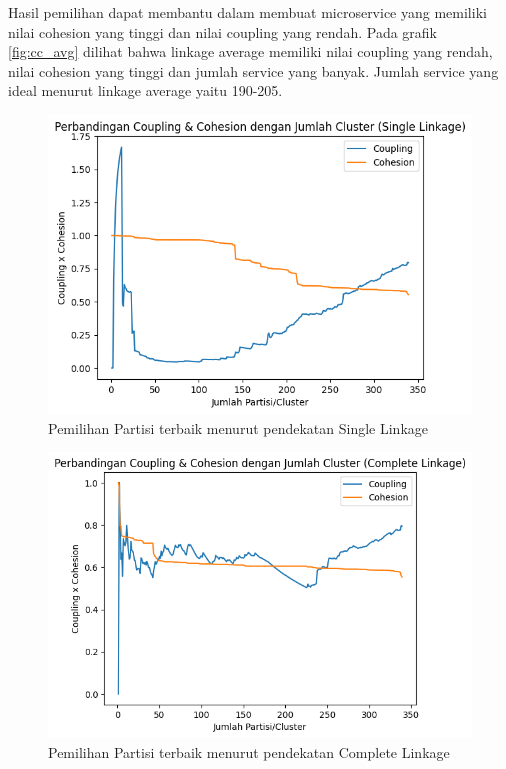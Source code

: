 Hasil pemilihan dapat membantu dalam membuat microservice yang memiliki nilai cohesion yang tinggi dan nilai coupling yang rendah. Pada grafik \ref{fig:cc_avg} dilihat bahwa linkage average memiliki nilai coupling yang rendah, nilai cohesion yang tinggi dan jumlah service yang banyak. Jumlah service yang ideal menurut linkage average yaitu 190-205. 

\begin{figure}[htbp]
	\centering
	\begin{minipage}{1\textwidth}
		\centering
		\includegraphics[width=1\textwidth]{img/bab_4/cc_single.png}
		\caption{Pemilihan Partisi terbaik menurut pendekatan Single Linkage }
		\label{fig:cc_single}
	\end{minipage}\hfill	
\end{figure}

\begin{figure}[htbp]
	\centering
	\begin{minipage}{1\textwidth}
		\centering
		\includegraphics[width=1\textwidth]{img/bab_4/cc_comp.png}
		\caption{Pemilihan Partisi terbaik menurut pendekatan Complete Linkage }
		\label{fig:cc_complete}
	\end{minipage}\hfill	
\end{figure}


